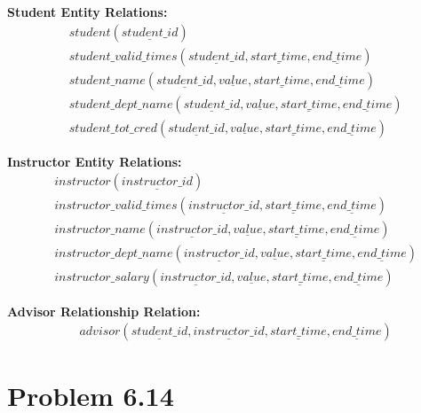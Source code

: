 \documentclass[12pt,a4paper]{article}
\begin{document}
\textbf{Student Entity Relations:}
\begin{align}
&\textit{student}(\underline{\textit{student\_id}}) \\
&\textit{student\_valid\_times}(\underline{\textit{student\_id}}, \underline{\textit{start\_time}}, \underline{\textit{end\_time}}) \\
&\textit{student\_name}(\underline{\textit{student\_id}}, \underline{\textit{value}}, \underline{\textit{start\_time}}, \underline{\textit{end\_time}}) \\
&\textit{student\_dept\_name}(\underline{\textit{student\_id}}, \underline{\textit{value}}, \underline{\textit{start\_time}}, \underline{\textit{end\_time}}) \\
&\textit{student\_tot\_cred}(\underline{\textit{student\_id}}, \underline{\textit{value}}, \underline{\textit{start\_time}}, \underline{\textit{end\_time}})
\end{align}

\textbf{Instructor Entity Relations:}
\begin{align}
&\textit{instructor}(\underline{\textit{instructor\_id}}) \\
&\textit{instructor\_valid\_times}(\underline{\textit{instructor\_id}}, \underline{\textit{start\_time}}, \underline{\textit{end\_time}}) \\
&\textit{instructor\_name}(\underline{\textit{instructor\_id}}, \underline{\textit{value}}, \underline{\textit{start\_time}}, \underline{\textit{end\_time}}) \\
&\textit{instructor\_dept\_name}(\underline{\textit{instructor\_id}}, \underline{\textit{value}}, \underline{\textit{start\_time}}, \underline{\textit{end\_time}}) \\
&\textit{instructor\_salary}(\underline{\textit{instructor\_id}}, \underline{\textit{value}}, \underline{\textit{start\_time}}, \underline{\textit{end\_time}})
\end{align}

\textbf{Advisor Relationship Relation:}
\begin{align}
&\textit{advisor}(\underline{\textit{student\_id}}, \underline{\textit{instructor\_id}}, \underline{\textit{start\_time}}, \underline{\textit{end\_time}})
\end{align}



\section*{Problem 6.14}
\end{document}
